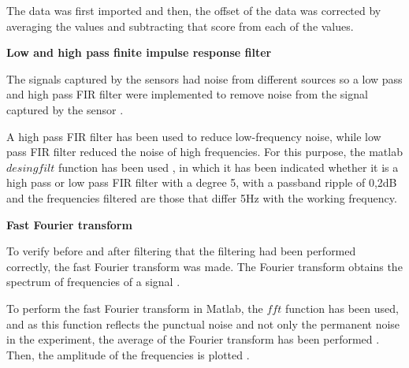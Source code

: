 \documentclass[12pt, a4paper]{article} %
\begin{document}
	The data was first imported and then, the offset of the data was corrected by averaging the values and subtracting that score from each of the values. 
	
	\setlength{\parindent}{8pt}
	\setlength{\parskip}{4mm}
	
	\setlength{\parindent}{0pt}
	\setlength{\parskip}{8mm}
	\textbf{Low and high pass finite impulse response filter}
	\setlength{\parskip}{0mm}
	
	The signals captured by the sensors had noise from different sources so a low pass and high pass FIR filter were implemented to remove noise from the signal captured by the sensor \cite{mondal2012novel}. 
	
	\setlength{\parskip}{4mm}
	\setlength{\parindent}{8pt}
	
	A high pass FIR filter has been used to reduce low-frequency noise, while low pass FIR filter reduced the noise of high frequencies. For this purpose, the matlab $desingfilt$ function has been used \cite{jacob2015digital}, in which it has been indicated whether it is a high pass or low pass FIR filter with a degree 5, with a passband ripple of 0,2dB and the frequencies filtered are those that differ 5Hz with the working frequency.
	
	\setlength{\parindent}{0pt}
	\setlength{\parskip}{8mm}
	\textbf{Fast Fourier transform}
	\setlength{\parskip}{0mm}
	
	To verify before and after filtering that the filtering had been performed correctly, the fast Fourier transform was made. The Fourier transform obtains the spectrum of frequencies of a signal \cite{de2001transformada}.
	
	\setlength{\parskip}{4mm}
	\setlength{\parindent}{8pt}
	
	To perform the fast Fourier transform in Matlab, the $fft$ function has been used, and as this function reflects the punctual noise and not only the permanent noise in the experiment, the average of the Fourier transform has been performed \cite{shabaninezhad2021matlab}. Then, the amplitude of the frequencies is plotted \cite{FourierTransform, frigo1998fftw}.
	
	\setlength{\parskip}{0mm}
\end{document}
